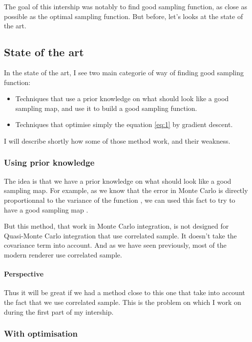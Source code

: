 \documentclass{classeENS}
\begin{document}
The goal of this intership was notably to find good sampling function, as close as 
possible as the optimal sampling function. But before, let's looks at the state of the art.

\subsection{State of the art}

In the state of the art, I see two main categorie of way of finding good sampling function:
\begin{itemize}
    \item Techniques that use a prior knowledge on what should look like a good sampling map, 
    and use it to build a good sampling function.
    \item Techniques that optimise simply the equation \ref{eq:1} by gradient descent.
\end{itemize}
I will describe shortly how some of those method work, and their weakness.

\subsubsection{Using prior knowledge}

\par The idea is that we have a prior knowledge on what should look like a good 
sampling map. For example, as we know that the error in Monte Carlo 
is directly proportionnal to the variance of the function \label{eq:variance},
we can used this fact to try to have a good sampling map \cite{10.1145/325165.325179}.

\par But this method, that work in Monte Carlo integration, is not designed for
Quasi-Monte Carlo integration that use correlated sample. It doesn't take the 
covariance term into account. 
And as we have seen previously, most of the modern renderer use correlated sample. 

\paragraph*{Perspective} Thus it will be great if we had a method close to this one that take into account
the fact that we use correlated sample. This is the problem on which I work on during the first
part of my intership.

\subsubsection{With optimisation}
\end{document}
